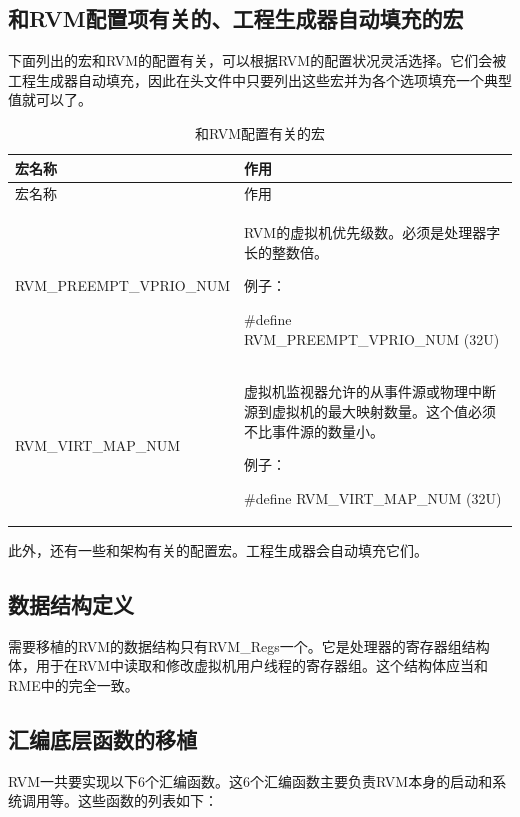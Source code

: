 \subsection{和RVM配置项有关的、工程生成器自动填充的宏}\label{subsec:8-2-4}

下面列出的宏和RVM的配置有关，可以根据RVM的配置状况灵活选择。它们会被工程生成器自动填充，因此在头文件中只要列出这些宏并为各个选项填充一个典型值就可以了。

\begin{xltabular}{\textwidth}{@{}>{\hsize\raggedright\arraybackslash}X>{\hsize\raggedright\arraybackslash}X@{}}
\caption{和RVM配置有关的宏}\label{tab:8-5}\\
\toprule
宏名称 & 作用\tabularnewline
\endfirsthead
\toprule
宏名称 & 作用\tabularnewline
\midrule
\endhead
\bottomrule
\endlastfoot
RVM\_\allowbreak{}PREEMPT\_\allowbreak{}VPRIO\_\allowbreak{}NUM\strut
 & RVM的虚拟机优先级数。必须是处理器字长的整数倍。

例子：

\#define RVM\_\allowbreak{}PREEMPT\_\allowbreak{}VPRIO\_\allowbreak{}NUM (32U)\strut
\tabularnewline
RVM\_\allowbreak{}VIRT\_\allowbreak{}MAP\_\allowbreak{}NUM\strut
 & 虚拟机监视器允许的从事件源或物理中断源到虚拟机的最大映射数量。这个值必须不比事件源的数量小。

例子：

\#define RVM\_\allowbreak{}VIRT\_\allowbreak{}MAP\_\allowbreak{}NUM (32U)\strut
\tabularnewline
\end{xltabular}

此外，还有一些和架构有关的配置宏。工程生成器会自动填充它们。

\subsection{数据结构定义}\label{subsec:8-2-5}

需要移植的RVM的数据结构只有RVM\_Regs一个。它是处理器的寄存器组结构体，用于在RVM中读取和修改虚拟机用户线程的寄存器组。这个结构体应当和RME中的完全一致。

\subsection{汇编底层函数的移植}\label{subsec:8-2-6}

RVM一共要实现以下6个汇编函数。这6个汇编函数主要负责RVM本身的启动和系统调用等。这些函数的列表如下：

